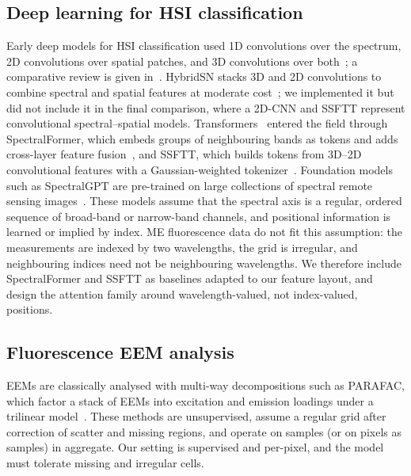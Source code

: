 \documentclass[journal]{IEEEtran}
\begin{document}
\subsection{Deep learning for HSI classification}
Early deep models for HSI classification used 1D convolutions over the spectrum, 2D convolutions over spatial patches, and 3D convolutions over both~\cite{chen2016cnnhsi,hamida20183d}; a comparative review is given in~\cite{audebert2019review}. HybridSN stacks 3D and 2D convolutions to combine spectral and spatial features at moderate cost~\cite{roy2020hybridsn}; we implemented it but did not include it in the final comparison, where a 2D-CNN and SSFTT represent convolutional spectral--spatial models. Transformers~\cite{vaswani2017attention,dosovitskiy2021vit} entered the field through SpectralFormer, which embeds groups of neighbouring bands as tokens and adds cross-layer feature fusion~\cite{hong2022spectralformer}, and SSFTT, which builds tokens from 3D--2D convolutional features with a Gaussian-weighted tokenizer~\cite{sun2022ssftt}. Foundation models such as SpectralGPT are pre-trained on large collections of spectral remote sensing images~\cite{hong2024spectralgpt}. These models assume that the spectral axis is a regular, ordered sequence of broad-band or narrow-band channels, and positional information is learned or implied by index. ME fluorescence data do not fit this assumption: the measurements are indexed by two wavelengths, the grid is irregular, and neighbouring indices need not be neighbouring wavelengths. We therefore include SpectralFormer and SSFTT as baselines adapted to our feature layout, and design the attention family around wavelength-valued, not index-valued, positions.

\subsection{Fluorescence EEM analysis}
EEMs are classically analysed with multi-way decompositions such as PARAFAC, which factor a stack of EEMs into excitation and emission loadings under a trilinear model~\cite{bro1997parafac,murphy2013parafac}. These methods are unsupervised, assume a regular grid after correction of scatter and missing regions, and operate on samples (or on pixels as samples) in aggregate. Our setting is supervised and per-pixel, and the model must tolerate missing and irregular cells.
\end{document}
